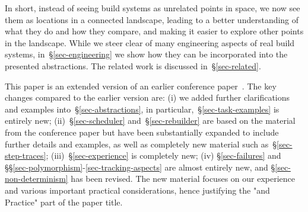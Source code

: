 In short, instead of seeing build systems as unrelated points in space, we now
see them as locations in a connected landscape, leading to a better
understanding of what they do and how they compare, and making it easier to
explore other points in the landscape. While we steer clear of many engineering
aspects of real build systems, in~\S\ref{sec-engineering} we show how they can
be incorporated into the presented abstractions. The related work is discussed
in~\S\ref{sec-related}.

This paper is an extended version of an earlier conference
paper~\cite{mokhov2018buildsystems}. The key changes compared to the earlier
version are: (i) we added further clarifications and examples
into~\S\ref{sec-abstractions}, in particular,~\S\ref{sec-task-examples} is
entirely new; (ii)~\S\ref{sec-scheduler} and~\S\ref{sec-rebuilder} are based on
the material from the conference paper but have been substantially expanded to
include further details and examples, as well as completely new material such
as~\S\ref{sec-step-traces}; (iii)~\S\ref{sec-experience} is completely new; (iv)
\S\ref{sec-failures} and \S\S\ref{sec-polymorphism}-\ref{sec-tracking-aspects}
are almost entirely new, and \S\ref{sec-non-determinism} has been revised.
The new material focuses on our experience and various important practical
considerations, hence justifying the "and Practice" part of the paper title.
